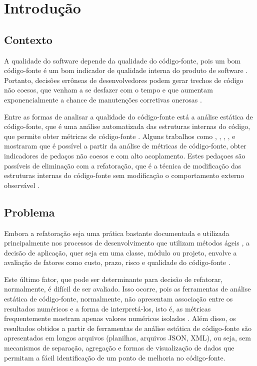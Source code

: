 \chapter{Introdução}


\section {Contexto}
A qualidade do software depende da qualidade do código-fonte, pois um bom código-fonte é um bom indicador de qualidade interna do produto de software \cite{beck2003test} \cite{ISO25023}. Portanto, decisões errôneas de desenvolvedores podem gerar trechos de código não coesos, que venham a se desfazer com o tempo e que aumentam exponencialmente a chance de manutenções corretivas onerosas \cite{beck2007implementation} \cite{beck1999}.


Entre as formas de analisar a qualidade do código-fonte está a análise estática de código-fonte, que é uma análise automatizada das estruturas internas do código, que permite obter métricas de código-fonte \cite{Emanuelsson2008} \cite{Wichmann95}  \cite{Nielson:1999} \cite{Sommerville10}. Alguns trabalhos como , , , ,  e  mostraram que é possível a partir da análise de métricas de código-fonte, obter indicadores de pedaços não coesos e com alto acoplamento. Estes pedaçoes são passíveis de eliminação com a refatoração, que é a técnica de modificação das estruturas internas do código-fonte sem modificação o comportamento externo observável \cite{fowler1999refactoring}.


\section{Problema}


Embora a refatoração seja uma prática bastante documentada e utilizada principalmente nos processos de desenvolvimento que utilizam métodos ágeis \cite{beck1999}, a decisão de aplicação, quer seja em uma classe, módulo ou projeto, envolve a avaliação de fatores como custo, prazo, risco e qualidade do código-fonte \cite{yamashita2013assessing}.  

Este último fator, que pode ser determinante para decisão de refatorar, normalmente, é difícil de ser avaliado. Isso ocorre, pois as ferramentas de análise estática de código-fonte, normalmente, não apresentam associação entre os resultados numéricos e a forma de interpretá-los, isto é, as métricas frequentemente mostram apenas valores numéricos isolados \cite{Meirelles2013}. Além disso, os resultados obtidos a partir de ferramentas de análise estática de código-fonte são apresentados em longos arquivos (planilhas, arquivos JSON, XML), ou seja, sem mecanismos de separação, agregação e formas de visualização de dados que permitam a fácil identificação de um ponto de melhoria no código-fonte.


